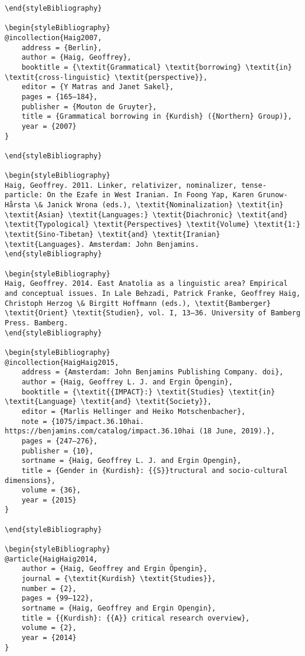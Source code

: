 \documentclass[output=paper]{langsci/langscibook}
\begin{document}
\begin{verbatim}
\end{styleBibliography}

\begin{styleBibliography}
@incollection{Haig2007,
	address = {Berlin},
	author = {Haig, Geoffrey},
	booktitle = {\textit{Grammatical} \textit{borrowing} \textit{in} \textit{cross-linguistic} \textit{perspective}},
	editor = {Y Matras and Janet Sakel},
	pages = {165–184},
	publisher = {Mouton de Gruyter},
	title = {Grammatical borrowing in {Kurdish} ({Northern} Group)},
	year = {2007}
}

\end{styleBibliography}

\begin{styleBibliography}
Haig, Geoffrey. 2011. Linker, relativizer, nominalizer, tense-particle: On the Ezafe in West Iranian. In Foong Yap, Karen Grunow-Hårsta \& Janick Wrona (eds.), \textit{Nominalization} \textit{in} \textit{Asian} \textit{Languages:} \textit{Diachronic} \textit{and} \textit{Typological} \textit{Perspectives} \textit{Volume} \textit{1:} \textit{Sino-Tibetan} \textit{and} \textit{Iranian} \textit{Languages}. Amsterdam: John Benjamins.
\end{styleBibliography}

\begin{styleBibliography}
Haig, Geoffrey. 2014. East Anatolia as a linguistic area? Empirical and conceptual issues. In Lale Behzadi, Patrick Franke, Geoffrey Haig, Christoph Herzog \& Birgitt Hoffmann (eds.), \textit{Bamberger} \textit{Orient} \textit{Studien}, vol. I, 13–36. University of Bamberg Press. Bamberg.
\end{styleBibliography}

\begin{styleBibliography}
@incollection{HaigHaig2015,
	address = {Amsterdam: John Benjamins Publishing Company. doi},
	author = {Haig, Geoffrey L. J. and Ergin Öpengin},
	booktitle = {\textit{{IMPACT}:} \textit{Studies} \textit{in} \textit{Language} \textit{and} \textit{Society}},
	editor = {Marlis Hellinger and Heiko Motschenbacher},
	note = {1075/impact.36.10hai. https://benjamins.com/catalog/impact.36.10hai (18 June, 2019).},
	pages = {247–276},
	publisher = {10},
	sortname = {Haig, Geoffrey L. J. and Ergin Opengin},
	title = {Gender in {Kurdish}: {{S}}tructural and socio-cultural dimensions},
	volume = {36},
	year = {2015}
}

\end{styleBibliography}

\begin{styleBibliography}
@article{HaigHaig2014,
	author = {Haig, Geoffrey and Ergin Öpengin},
	journal = {\textit{Kurdish} \textit{Studies}},
	number = {2},
	pages = {99–122},
	sortname = {Haig, Geoffrey and Ergin Opengin},
	title = {{Kurdish}: {{A}} critical research overview},
	volume = {2},
	year = {2014}
}


\end{verbatim}
\end{document}
